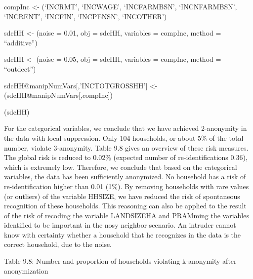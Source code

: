 \documentclass[letterpaper,10pt,english]{sphinxmanual}
\begin{document}
\begin{DUlineblock}{0em}
\item[] compInc \textless{}- (‘INCRMT’, ‘INCWAGE’, ‘INCFARMBSN’, ‘INCNFARMBSN’,
‘INCRENT’, ‘INCFIN’, ‘INCPENSN’, ‘INCOTHER’)
\item[] 
\end{DUlineblock}

sdcHH \textless{}- (noise = 0.01, obj = sdcHH, variables = compInc,
method = “additive”)


sdcHH \textless{}- (noise = 0.05, obj = sdcHH, variables = compInc,
method = “outdect”)


sdcHH@manipNumVars{[},’INCTOTGROSSHH’{]} \textless{}-
(sdcHH@manipNumVars{[},compInc{]})


(sdcHH)


For the categorical variables, we conclude that we have achieved
2-anonymity in the data with local suppression. Only 104 households, or
about 5\% of the total number, violate 3-anonymity. Table 9.8 gives an
overview of these risk measures. The global risk is reduced to 0.02\%
(expected number of re-identifications 0.36), which is extremely low.
Therefore, we conclude that based on the categorical variables, the data
has been sufficiently anonymized. No household has a risk of
re-identification higher than 0.01 (1\%). By removing households with
rare values (or outliers) of the variable HHSIZE, we have reduced the
risk of spontaneous recognition of these households. This reasoning can
also be applied to the result of the risk of recoding the variable
LANDSIZEHA and PRAMming the variables identified to be important in the
nosy neighbor scenario. An intruder cannot know with certainty whether a
household that he recognizes in the data is the correct household, due
to the noise.

Table 9.8: Number and proportion of households violating k-anonymity
after anonymization
\end{document}

